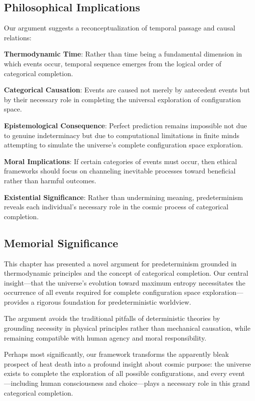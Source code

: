 \documentclass[12pt,a4paper]{article}
\theoremstyle{definition}
\begin{document}
{\subsection{Philosophical Implications}

Our argument suggests a reconceptualization of temporal passage and causal relations:

\textbf{Thermodynamic Time}: Rather than time being a fundamental dimension in which events occur, temporal sequence emerges from the logical order of categorical completion.

\textbf{Categorical Causation}: Events are caused not merely by antecedent events but by their necessary role in completing the universal exploration of configuration space.

\textbf{Epistemological Consequence}: Perfect prediction remains impossible not due to genuine indeterminacy but due to computational limitations in finite minds attempting to simulate the universe's complete configuration space exploration.

\textbf{Moral Implications}: If certain categories of events must occur, then ethical frameworks should focus on channeling inevitable processes toward beneficial rather than harmful outcomes.

\textbf{Existential Significance}: Rather than undermining meaning, predeterminism reveals each individual's necessary role in the cosmic process of categorical completion.

\subsection{Memorial Significance}

This chapter has presented a novel argument for predeterminism grounded in thermodynamic principles and the concept of categorical completion. Our central insight—that the universe's evolution toward maximum entropy necessitates the occurrence of all events required for complete configuration space exploration—provides a rigorous foundation for predeterministic worldview.

The argument avoids the traditional pitfalls of deterministic theories by grounding necessity in physical principles rather than mechanical causation, while remaining compatible with human agency and moral responsibility.

Perhaps most significantly, our framework transforms the apparently bleak prospect of heat death into a profound insight about cosmic purpose: the universe exists to complete the exploration of all possible configurations, and every event—including human consciousness and choice—plays a necessary role in this grand categorical completion.

}
\end{document}
